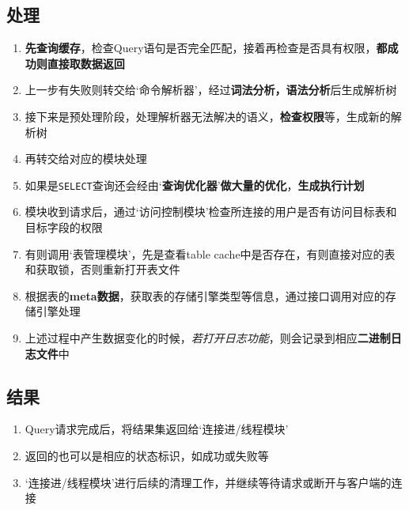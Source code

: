 \documentclass[UTF8,a4paper,12pt]{ctexbook}
\begin{document}
		\subsection{处理}
			\begin{enumerate}
				\item \textbf{先查询缓存}，检查Query语句是否完全匹配，接着再检查是否具有权限，\textbf{都成功则直接取数据返回}
				\item 上一步有失败则转交给‘命令解析器’，经过\textbf{词法分析，语法分析}后生成解析树
				\item 接下来是预处理阶段，处理解析器无法解决的语义，\textbf{检查权限}等，生成新的解析树
				\item 再转交给对应的模块处理
				\item 如果是\verb|SELECT|查询还会经由‘\textbf{查询优化器}’\textbf{做大量的优化}，\textbf{生成执行计划}
				\item 模块收到请求后，通过‘访问控制模块’检查所连接的用户是否有访问目标表和目标字段的权限
				\item 有则调用‘表管理模块’，先是查看table cache中是否存在，有则直接对应的表和获取锁，否则重新打开表文件
				\item 根据表的\textbf{meta数据}，获取表的存储引擎类型等信息，通过接口调用对应的存储引擎处理
				\item 上述过程中产生数据变化的时候，\textit{若打开日志功能}，则会记录到相应\textbf{二进制日志文件}中
			\end{enumerate}
		
		\subsection{结果}
			\begin{enumerate}
				\item Query请求完成后，将结果集返回给‘连接进/线程模块’
				\item 返回的也可以是相应的状态标识，如成功或失败等
				\item ‘连接进/线程模块’进行后续的清理工作，并继续等待请求或断开与客户端的连接
			\end{enumerate}
			
\end{document}
